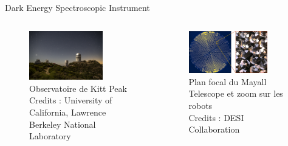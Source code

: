 \documentclass{beamer}
\newcommand{\credits}[1]{\tiny Credits : #1}
\begin{document}
\begin{frame}{Dark Energy Spectroscopic Instrument}
\begin{columns}
\begin{column}{.5\textwidth}
	\begin{figure}
		\centering
		\includegraphics[width=0.75\textwidth]{figures/kitt_peak.png}
		\caption{Observatoire de Kitt Peak \\ \credits{University of California, Lawrence Berkeley National Laboratory}}
	\end{figure}
\end{column}
\begin{column}{.5\textwidth}
	\begin{figure}
		\centering
		\includegraphics[width=0.8\textwidth]{figures/DESI_robots.jpg}
		\caption{Plan focal du Mayall Telescope et zoom sur les robots\\ \credits{DESI Collaboration}}
	\end{figure}
\end{column}
\end{columns}
\end{frame}
\end{document}
